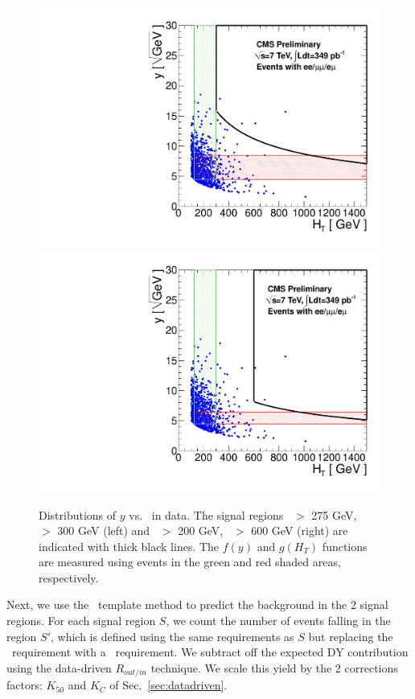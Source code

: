 \begin{figure}[hbt]
\begin{center}
\includegraphics[width=0.48\linewidth]{plots_final/abcdprime_349pb_highmet.pdf}
\includegraphics[width=0.48\linewidth]{plots_final/abcdprime_349pb_highht.pdf}
\caption{\label{fig:abcdprimedata}\protect 
Distributions of $y$ vs. \Ht\ in data. The signal regions \met\ $>$ 275 GeV, \Ht\ $>$ 300 GeV (left)
and \met\ $>$ 200 GeV, \Ht\ $>$ 600 GeV (right) are indicated with thick black lines. 
The $f(y)$ and $g(H_T)$ 
functions are measured using events in the green and red shaded areas, respectively.
}
\end{center}
\end{figure}

Next, we use the \ptll\ template method to predict the background in the 2 signal regions.
For each signal region $S$, we count the number of events falling in the region $S'$, which is 
defined using the same requirements as $S$ but replacing the \MET\ requirement with a \ptll\
requirement. We subtract off the expected DY contribution using the data-driven $R_{out/in}$
technique. We scale this yield by the 2 corrections factors: $K_{50}$ and $K_C$ of Sec.~\ref{sec:datadriven}.



